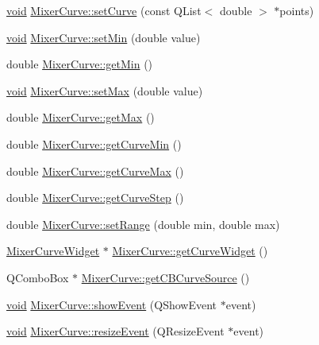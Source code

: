 \begin{DoxyCompactItemize}
\hyperlink{group___u_a_v_objects_plugin_ga444cf2ff3f0ecbe028adce838d373f5c}{void} \hyperlink{group___config_plugin_ga0292ee7413de63e428fd0ca9ec2d0f08}{\-Mixer\-Curve\-::set\-Curve} (const \-Q\-List$<$ double $>$ $\ast$points)
\item 
\hyperlink{group___u_a_v_objects_plugin_ga444cf2ff3f0ecbe028adce838d373f5c}{void} \hyperlink{group___config_plugin_gae709bb34fd5b4386c7538059fd77e523}{\-Mixer\-Curve\-::set\-Min} (double value)
\item 
double \hyperlink{group___config_plugin_ga6d107a62e8f6d1115afbe9869d5fbf62}{\-Mixer\-Curve\-::get\-Min} ()
\item 
\hyperlink{group___u_a_v_objects_plugin_ga444cf2ff3f0ecbe028adce838d373f5c}{void} \hyperlink{group___config_plugin_ga122781733f46efdca9586ab7d1cb46e3}{\-Mixer\-Curve\-::set\-Max} (double value)
\item 
double \hyperlink{group___config_plugin_ga218856c51ab9ecff11ecfcf0f6074589}{\-Mixer\-Curve\-::get\-Max} ()
\item 
double \hyperlink{group___config_plugin_gae8aad43963c9ca3ce7412e3f8f023e84}{\-Mixer\-Curve\-::get\-Curve\-Min} ()
\item 
double \hyperlink{group___config_plugin_ga00f0ef17d7a211c8cfa37feb02cc032c}{\-Mixer\-Curve\-::get\-Curve\-Max} ()
\item 
double \hyperlink{group___config_plugin_ga2f4e12f8e1036a490fe9846548bcb197}{\-Mixer\-Curve\-::get\-Curve\-Step} ()
\item 
double \hyperlink{group___config_plugin_ga7cd12492effe33f54cbbbc2eed7a5acb}{\-Mixer\-Curve\-::set\-Range} (double min, double max)
\item 
\hyperlink{class_mixer_curve_widget}{\-Mixer\-Curve\-Widget} $\ast$ \hyperlink{group___config_plugin_ga289025b567020147913c14fbdf51b3d6}{\-Mixer\-Curve\-::get\-Curve\-Widget} ()
\item 
\-Q\-Combo\-Box $\ast$ \hyperlink{group___config_plugin_ga8822c0ca3bfdc63eaa942da572b0b8af}{\-Mixer\-Curve\-::get\-C\-B\-Curve\-Source} ()
\item 
\hyperlink{group___u_a_v_objects_plugin_ga444cf2ff3f0ecbe028adce838d373f5c}{void} \hyperlink{group___config_plugin_ga7ccd9c0dd214329e0801e42b6d2858b9}{\-Mixer\-Curve\-::show\-Event} (\-Q\-Show\-Event $\ast$event)
\item 
\hyperlink{group___u_a_v_objects_plugin_ga444cf2ff3f0ecbe028adce838d373f5c}{void} \hyperlink{group___config_plugin_gab7f43f88c7142be2694361b898a0bdc0}{\-Mixer\-Curve\-::resize\-Event} (\-Q\-Resize\-Event $\ast$event)

\end{DoxyCompactItemize}
